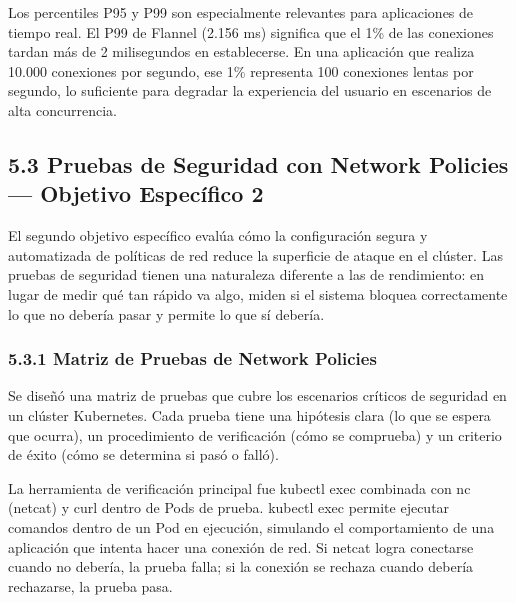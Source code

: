 \documentclass[journal]{IEEEtran}
\begin{document}
Los percentiles P95 y P99 son especialmente relevantes para aplicaciones de tiempo real. El P99 de Flannel (2.156 ms) significa que el 1\% de las conexiones tardan más de 2 milisegundos en establecerse. En una aplicación que realiza 10.000 conexiones por segundo, ese 1\% representa 100 conexiones lentas por segundo, lo suficiente para degradar la experiencia del usuario en escenarios de alta concurrencia.

\subsection{5.3 Pruebas de Seguridad con Network Policies --- Objetivo Específico 2}

El segundo objetivo específico evalúa cómo la configuración segura y automatizada de políticas de red reduce la superficie de ataque en el clúster. Las pruebas de seguridad tienen una naturaleza diferente a las de rendimiento: en lugar de medir qué tan rápido va algo, miden si el sistema bloquea correctamente lo que no debería pasar y permite lo que sí debería.

\subsubsection{5.3.1 Matriz de Pruebas de Network Policies}

Se diseñó una matriz de pruebas que cubre los escenarios críticos de seguridad en un clúster Kubernetes. Cada prueba tiene una hipótesis clara (lo que se espera que ocurra), un procedimiento de verificación (cómo se comprueba) y un criterio de éxito (cómo se determina si pasó o falló).

La herramienta de verificación principal fue kubectl exec combinada con nc (netcat) y curl dentro de Pods de prueba. kubectl exec permite ejecutar comandos dentro de un Pod en ejecución, simulando el comportamiento de una aplicación que intenta hacer una conexión de red. Si netcat logra conectarse cuando no debería, la prueba falla; si la conexión se rechaza cuando debería rechazarse, la prueba pasa.
\end{document}

